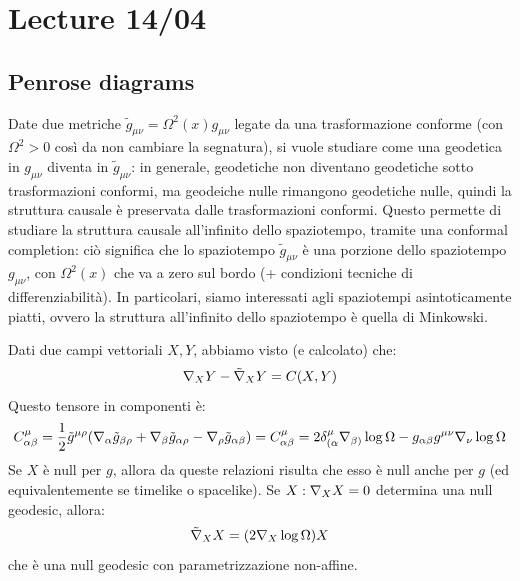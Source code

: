 \chapter{Lecture 14/04}

\section{Penrose diagrams}

Date due metriche $ \tilde{g}_{\mu \nu} = \Omega^2(x) g_{\mu \nu} $ legate da una trasformazione conforme (con $ \Omega^2 > 0 $ così da non cambiare la segnatura), si vuole studiare come una geodetica in $ g_{\mu \nu} $ diventa in $ \tilde{g}_{\mu \nu} $: in generale, geodetiche non diventano geodetiche sotto trasformazioni conformi, ma geodeiche nulle rimangono geodetiche nulle, quindi la struttura causale è preservata dalle trasformazioni conformi. Questo permette di studiare la struttura causale all'infinito dello spaziotempo, tramite una conformal completion: ciò significa che lo spaziotempo $ \tilde{g}_{\mu \nu} $ è una porzione dello spaziotempo $ g_{\mu \nu} $, con $ \Omega^2(x) $ che va a zero sul bordo (+ condizioni tecniche di differenziabilità). In particolari, siamo interessati agli spaziotempi asintoticamente piatti, ovvero la struttura all'infinito dello spaziotempo è quella di Minkowski.

Dati due campi vettoriali $ X,Y $, abbiamo visto (e calcolato) che:
\begin{equation}
  \nabla_X Y - \tilde{\nabla}_X Y = C(X,Y)
\end{equation}
Questo tensore in componenti è:
\begin{equation}
  C^\mu_{\alpha \beta} = \frac{1}{2} \tilde{g}^{\mu \rho} (\nabla_\alpha \tilde{g}_{\beta \rho} + \nabla_\beta \tilde{g}_{\alpha \rho} - \nabla_\rho \tilde{g}_{\alpha \beta}) = C^\mu_{\alpha \beta} = 2 \delta^\mu_{(\alpha} \nabla_{\beta)} \log \Omega - g_{\alpha \beta} g^{\mu \nu} \nabla_\nu \log \Omega
\end{equation}
Se $ X $ è null per $ g $, allora da queste relazioni risulta che esso è null anche per $ g $ (ed equivalentemente se timelike o spacelike). Se $ X : \nabla_X X = 0 $ determina una null geodesic, allora:
\begin{equation*}
  \tilde{\nabla}_X X = (2 \nabla_X \log \Omega) X
\end{equation*}
che è una null geodesic con parametrizzazione non-affine.

